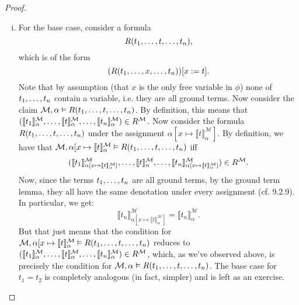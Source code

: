 \begin{enumerate}[\thesection.1]
\begin{proof}
\begin{enumerate}[(i)]
              \item  For the base case,
                consider a formula \[R(t_1, \mathellipsis,t,
                  \mathellipsis, t_n),\] which is of the
                form \[(R(t_1, \mathellipsis,x, \mathellipsis,
                  t_n))[x:=t].\] Note that by assumption (that $x$ is
                the only free variable in $\phi$) none of
                $t_1,\mathellipsis, t_n$ contain a variable, i.e. they
                are all ground terms. Now consider the claim
                $\mathcal{M},\alpha\vDash R(t_1, \mathellipsis,t,
                \mathellipsis, t_n)$. By definition, this means that
                $(\llbracket
                t_1\rrbracket^\mathcal{M}_\alpha,\mathellipsis,
                \llbracket
                t\rrbracket^\mathcal{M}_\alpha,\mathellipsis,\llbracket
                t_n\rrbracket^\mathcal{M}_\alpha)\in
                R^\mathcal{M}$. Now consider the formula $R(t_1,
                \mathellipsis, t, \mathellipsis, t_n)$  under the
                assignment $\alpha[x\mapsto \llbracket
                t\rrbracket^\mathcal{M}_\alpha]$. By definition, we
                have that $\mathcal{M}, \alpha[x\mapsto \llbracket
                t\rrbracket^\mathcal{M}_\alpha\vDash R(t_1,
                \mathellipsis, t, \mathellipsis, t_n)$ iff
                \[(\llbracket
                t_1\rrbracket^\mathcal{M}_{\alpha[x\mapsto \llbracket
                t\rrbracket^\mathcal{M}_\alpha]},\mathellipsis,
                \llbracket
                t\rrbracket^\mathcal{M}_\alpha,\mathellipsis,\llbracket
                t_n\rrbracket^\mathcal{M}_{\alpha[x\mapsto \llbracket
                t\rrbracket^\mathcal{M}_\alpha]})\in
                R^\mathcal{M}.\] Now, since the terms $t_1,
              \mathellipsis, t_n$ %
              are all ground terms, by the ground
              term lemma, they all have the same denotation under
              every assignment (cf. 9.2.9). In particular, we get: \[\llbracket
                t_n\rrbracket^\mathcal{M}_{\alpha[x\mapsto \llbracket
                t\rrbracket^\mathcal{M}_\alpha]}=\llbracket
                t_n\rrbracket^\mathcal{M}_{\alpha}.\]
              But that just means that the condition for $\mathcal{M},
              \alpha[x\mapsto \llbracket 
                t\rrbracket^\mathcal{M}_\alpha\vDash R(t_1,
                \mathellipsis, t, \mathellipsis, t_n)$ reduces to
                $(\llbracket
                t_1\rrbracket^\mathcal{M}_\alpha,\mathellipsis,
                \llbracket
                t\rrbracket^\mathcal{M}_\alpha,\mathellipsis,\llbracket
                t_n\rrbracket^\mathcal{M}_\alpha)\in
                R^\mathcal{M}$, which, as we've observed above, is
                precisely the condition for
                $\mathcal{M},\alpha\vDash R(t_1, \mathellipsis,t,
                \mathellipsis, t_n)$. The base case for $t_1=t_2$ is
                completely analogous (in fact, simpler) and is left as
                an exercise. 


\end{enumerate}
\end{proof}
\end{enumerate}
